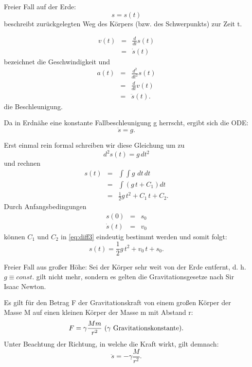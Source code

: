 \documentclass[10pt]{scrbook}
\begin{document}
\begin{Bsp}
Freier Fall auf der Erde:
\begin{displaymath}
s=s(t)
\end{displaymath}
beschreibt zurückgelegten Weg des Körpers (bzw. des Schwerpunkts) zur Zeit t.

\begin{eqnarray*}
v(t) & =& \frac{d}{dt}s(t) \\
 & = & \dot{s}(t)
\end{eqnarray*}
bezeichnet die Geschwindigkeit und 
\begin{eqnarray*}
a(t) & = & \frac{d^2}{dt^2}s(t) \\
& = & \frac{d}{dt}v(t) \\
& = & \ddot{s}(t).
\end{eqnarray*}
die Beschleunigung.

Da in Erdnähe eine konstante Fallbeschleunigung g herrscht, ergibt sich die ODE:
\begin{displaymath}
\ddot{s} = g.
\end{displaymath}

Erst einmal rein formal schreiben wir diese Gleichung um zu
\begin{displaymath}
d^2 s(t)=g\,dt^2
\end{displaymath}
und rechnen
\begin{eqnarray}
s(t) & = & \int \int g\,\,dt\,dt \nonumber\\
& = & \int \left(g\,t + C_1\right) dt \nonumber \\
& = & \frac{1}{2} g\,t^2 + C_1\,t + C_2. \label{eq:diff3}
\end{eqnarray}
Durch Anfangsbedingungen
\begin{eqnarray}
s(0) & = & s_0 \nonumber \\
\dot{s}(t) & = & v_0 \nonumber
\end{eqnarray}
können $C_1$ und $C_2$ in \eqref{eq:diff3} eindeutig bestimmt werden und somit folgt:
\begin{displaymath}
s(t) = \frac{1}{2} g\,t^2 + v_0\,t + s_0.
\end{displaymath}
\end{Bsp}

\begin{Bsp}
\label{bsp:newton}
Freier Fall aus großer Höhe:
Sei der Körper sehr weit von der Erde entfernt, d. h. $g \equiv const.$ gilt nicht mehr, sondern es gelten die Gravitationsgesetze nach Sir Isaac Newton.

Es gilt für den Betrag F der Gravitationskraft von einem großen Körper der Masse M auf einen kleinen Körper der Masse m mit Abstand r:
\begin{displaymath}
F = \gamma \frac{M m}{r^2}\textnormal{ ($\gamma$ Gravitationskonstante)}.
\end{displaymath}
Unter Beachtung der Richtung, in welche die Kraft wirkt, gilt demnach:
\begin{equation}
\ddot{s} = -\gamma \frac{M}{r^2}. \label{eq:diff_newton}
\end{equation}
\end{Bsp}
\end{document}
